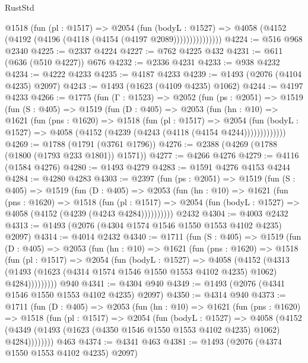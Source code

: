 \begin{lexlean}{RustStd}
\begin{coremodule}
                @1518
                  (fun (pl : @1517) =>
                  @2054
                    (fun (bodyL : @1527) =>
                    @4058 (@4152 (@4192 (@4196 (@4118 (@4154 (@4197 @2089)))))))))))))))
@4224 := @516 @968 @2340
@4225 := @2337 @4224
@4227 := @762 @4225 @432
@4231 := @611 (@636 (@510 @4227)) @676
@4232 := @2336 @4231
@4233 := @938 @4232
@4234 := @4222 @4233
@4235 := @4187 @4233
@4239 := @1493 (@2076 (@4104 @4235) @2097)
@4243 := @1493 (@1623 (@4109 @4235) @1062)
@4244 := @4197 @4233
@4266 := @1775
    (fun (Γ : @1523) =>
    @2052
      (fun (ps : @2051) =>
      @1519
        (fun (S : @405) =>
        @1519
          (fun (D : @405) =>
          @2053
            (fun (hn : @10) =>
            @1621
              (fun (pns : @1620) =>
              @1518
                (fun (pl : @1517) =>
                @2054
                  (fun (bodyL : @1527) =>
                  @4058 (@4152 (@4239 (@4243 (@4118 (@4154 @4244)))))))))))))
@4269 := @1788 (@1791 (@3761 @1796))
@4276 := @2388 (@4269 (@1788 (@1800 (@1793 @233 @1801)) @1571))
@4277 := @4266 @4276
@4279 := @4116 (@1584 @4276)
@4280 := @1493 @4279
@4283 := @1591 @4276 @4153 @4244
@4284 := @4280 @4283
@4303 := @2397
    (fun (ps : @2051) =>
    @1519
      (fun (S : @405) =>
      @1519
        (fun (D : @405) =>
        @2053
          (fun (hn : @10) =>
          @1621
            (fun (pns : @1620) =>
            @1518
              (fun (pl : @1517) =>
              @2054 (fun (bodyL : @1527) => @4058 (@4152 (@4239 (@4243 @4284))))))))))
    @2432
@4304 := @4003 @2432
@4313 := @1493 (@2076 (@4304 @1574 @1546 @1550 @1553 @4102 @4235) @2097)
@4314 := @4014 @2432
@4340 := @1711
    (fun (S : @405) =>
    @1519
      (fun (D : @405) =>
      @2053
        (fun (hn : @10) =>
        @1621
          (fun (pns : @1620) =>
          @1518
            (fun (pl : @1517) =>
            @2054
              (fun (bodyL : @1527) =>
              @4058
                (@4152
                  (@4313
                    (@1493 (@1623 (@4314 @1574 @1546 @1550 @1553 @4102 @4235) @1062) @4284)))))))))
    @940
@4341 := @4304 @940
@4349 := @1493 (@2076 (@4341 @1546 @1550 @1553 @4102 @4235) @2097)
@4350 := @4314 @940
@4373 := @1711
    (fun (D : @405) =>
    @2053
      (fun (hn : @10) =>
      @1621
        (fun (pns : @1620) =>
        @1518
          (fun (pl : @1517) =>
          @2054
            (fun (bodyL : @1527) =>
            @4058
              (@4152 (@4349 (@1493 (@1623 (@4350 @1546 @1550 @1553 @4102 @4235) @1062) @4284))))))))
    @463
@4374 := @4341 @463
@4381 := @1493 (@2076 (@4374 @1550 @1553 @4102 @4235) @2097)

\end{coremodule}
\end{lexlean}
